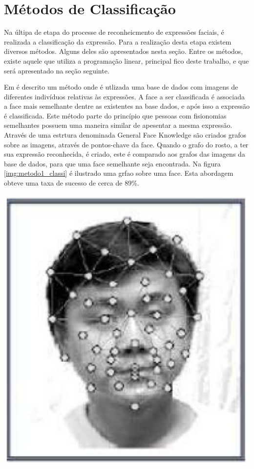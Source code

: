 \section{Métodos de Classificação}
Na últipa de etapa do processe de reconheicmento de expressões faciais, é realizada a classificação da expressão. Para a realização desta etapa existem diversos métodos. Alguns deles são apresentados nesta seção. Entre os métodos, existe aquele que utiliza a programação linear, principal fico deste trabalho, e que será apresentado na seção seguinte.

Em \cite{Hong} é descrito um método onde é utlizada uma base de dados com imagens de diferentes indivíduos relativas às expressões. A face a ser classificada é associada a face mais semelhante dentre as existentes na base dados, e após isso a expressão é classificada. Este método parte do princípio que pessoas com fisionomias semelhantes possuem uma maneira similar de apesentar a mesma expressão. Através de uma estrtura denominada General Face Knowledge são criados grafos sobre as imagens, através de pontos-chave da face. Quando o grafo do rosto, a ter sua expressão reconhecida, é criado, este é comparado aos grafos das imagens da base de dados, para que uma face semelhante seja encontrada. Na figura \ref{img:metodo1_classi} é ilustrado uma grfao sobre uma face. Esta abordagem obteve uma taxa de sucesso de cerca de 89\%.
\begin{center}
	\includegraphics[scale=0.5]{graficos/metodo1_classi}
	\label{img:metodo1_classi}
\end{center}

